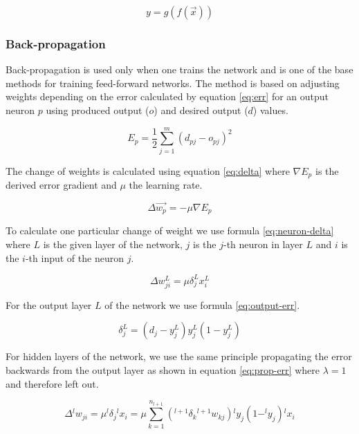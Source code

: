 \begin{equation}
    y = g( f( \vec{x} ) )
    \label{eq:output}
\end{equation}


\subsubsection{Back-propagation}
Back-propagation is used only when one trains the network and is one of the base methods for training feed-forward networks. The method is based on adjusting weights depending on the error calculated by equation \ref{eq:err} for an output neuron $ p $ using produced output ($ o $) and desired output ($ d $) values.

\begin{equation}
    E_p = \frac{1}{2} \sum_{j = 1}^{m} (d_{pj} - o_{pj})^2
    \label{eq:err}
\end{equation}

The change of weights is calculated using equation \ref{eq:delta} where $ \nabla E_p $ is the derived error gradient and $ \mu $ the learning rate.

\begin{equation}
    \Delta \vec{w_p} = -\mu \nabla E_p
    \label{eq:delta}
\end{equation}

To calculate one particular change of weight we use formula \ref{eq:neuron-delta} where $ L $ is the given layer of the network, $ j $ is the $j$-th neuron in layer $ L $ and $ i $ is the $i$-th input of the neuron $ j $.

\begin{equation}
    \Delta w_{ji}^L = \mu \delta_j^L x_i^L
    \label{eq:neuron-delta}
\end{equation}

For the output layer $ L $ of the network we use formula \ref{eq:output-err}.

\begin{equation}
    \delta_j^L = (d_j - y_j^L) y_j^L(1 - y_j^L)
    \label{eq:output-err}
\end{equation}

For hidden layers of the network, we use the same principle propagating the error backwards from the output layer as shown in equation \ref{eq:prop-err} where $\lambda = 1$ and therefore left out.

\begin{equation}
    \Delta {^l w}_{ji} = \mu {^l\delta}_j {^lx}_i = \mu \sum_{k = 1}^{n_{l+1}} (^{l+1}\delta_k {^{l+1}w}_{kj}) {^ly}_j (1 - ^ly_j){^lx}_i
    \label{eq:prop-err}
\end{equation}

